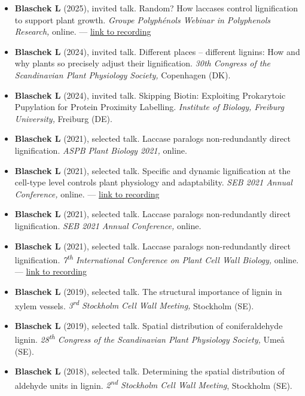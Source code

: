 \documentclass[11pt]{article}
\begin{document}
\vspace{-0.175cm}
\begin{itemize}[label={},itemindent=-9pt,leftmargin=24pt]
	\itemsep-0.1cm
	\item \textbf{Blaschek L} (2025), invited talk. Random? How laccases control lignification to support plant growth. \textit{Groupe Polyphénols Webinar in Polyphenols Research,} online. --- \href{https://www.youtube.com/@groupepolyphenols}{link to recording}
	\item \textbf{Blaschek L} (2024), invited talk. Different places – different lignins:
	How and why plants so precisely adjust their lignification. \textit{30th Congress of the Scandinavian Plant Physiology Society,} Copenhagen (DK).
	\item \textbf{Blaschek L} (2024), invited talk. Skipping Biotin: Exploiting Prokarytoic Pupylation for Protein Proximity Labelling. \textit{Institute of Biology, Freiburg University,} Freiburg (DE).
	\item \textbf{Blaschek L} (2021), selected talk. Laccase paralogs non-redundantly direct lignification. \textit{ASPB Plant Biology 2021,} online.
	\item \textbf{Blaschek L} (2021), selected talk. Specific and dynamic lignification at the cell-type level controls plant physiology and adaptability. \textit{SEB 2021 Annual Conference,} online. --- \href{https://leonardblaschek.github.io/talks.html}{link to recording}
	\item \textbf{Blaschek L} (2021), selected talk. Laccase paralogs non-redundantly direct lignification. \textit{SEB 2021 Annual Conference,} online.
	\item \textbf{Blaschek L} (2021), selected talk. Laccase paralogs non-redundantly direct lignification. \textit{7\textsuperscript{th} International Conference on Plant Cell Wall Biology,} online. --- \href{https://leonardblaschek.github.io/talks.html}{link to recording}
	\item \textbf{Blaschek L} (2019), selected talk. The structural importance of lignin in xylem vessels. \textit{3\textsuperscript{rd} Stockholm Cell Wall Meeting,} Stockholm (SE).
	\item \textbf{Blaschek L} (2019), selected talk. Spatial distribution of coniferaldehyde lignin. \textit{28\textsuperscript{th} Congress of the Scandinavian Plant Physiology Society,} Umeå (SE).
	\item \textbf{Blaschek L} (2018), selected talk. Determining the spatial distribution of aldehyde units in lignin. \textit{2\textsuperscript{nd} Stockholm Cell Wall Meeting}, Stockholm (SE).
\end{itemize}
\vspace{0.3cm}
\end{document}
